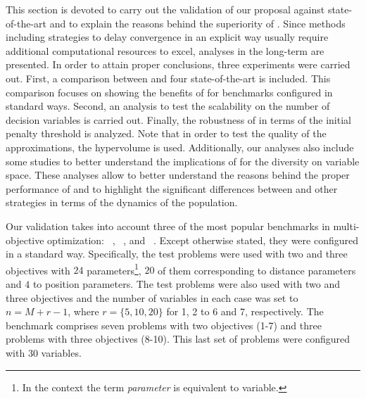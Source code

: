 This section is devoted to carry out the validation of our proposal against state-of-the-art \MOEAS{} and
to explain the reasons behind the superiority of \AVSDMOEAD{}.
%
%
Since methods including strategies to delay convergence in an explicit way usually require additional computational
resources to excel, analyses in the long-term are presented.
%
In order to attain proper conclusions, three experiments were carried out.
%
First, a comparison between \AVSDMOEAD{} and four state-of-the-art \MOEAS{} is included.
%
This comparison focuses on showing the benefits of \AVSDMOEAD{} for benchmarks 
configured in standard ways.
%
Second, an analysis to test the scalability on the number of decision variables is carried out.
%
Finally, the robustness of \AVSDMOEAD{} in terms of the initial penalty threshold is analyzed.
%
Note that in order to test the quality of the approximations, the hypervolume is used.
%
Additionally, our analyses also include some studies to better understand
the implications of \AVSDMOEAD{} for the diversity on variable space.
%
These analyses allow to better understand the reasons behind the proper performance of \AVSDMOEAD{}
and to highlight the significant differences between \AVSDMOEAD{} and other strategies in terms of the dynamics
of the population.



Our validation takes into account three of the most popular benchmarks in multi-objective optimization:
\WFG{}~\cite{huband2006review}, \DTLZ{}~\cite{deb2005scalable}, and \UF{}~\cite{zhang2008multiobjective}.
%
Except otherwise stated, they were configured in a standard way.
%
Specifically, the \WFG{} test problems were used with two and three objectives with $24$ 
parameters\footnote{In the \WFG{} context the term \textit{parameter} is equivalent to variable.}, 
$20$ of them corresponding to distance parameters and $4$ to position parameters.
%
The \DTLZ{} test problems were also used with two and three objectives and the number of variables in each
case was set to $n=M+r-1$, where $r=\{5, 10, 20\}$ for \DTLZ{}1, \DTLZ{}2 to \DTLZ{}6 and \DTLZ{}7, respectively.
% 
The \UF{} benchmark comprises seven problems with two objectives (\UF{}1-7) and three problems with three objectives (\UF{}8-10).
%
This last set of problems were configured with $30$ variables.

